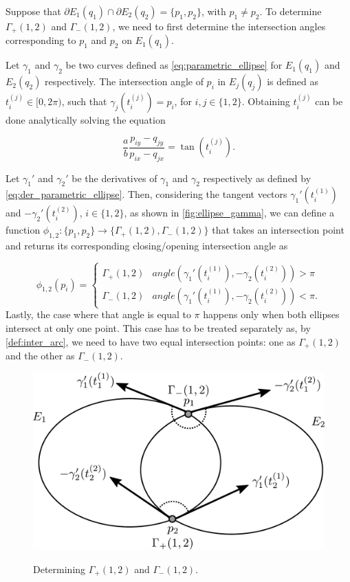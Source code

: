 Suppose that $\partial E_1(q_1) \cap \partial E_2(q_2) = \{p_1, p_2\}$, with $p_1 \neq p_2$. To determine $\Gamma_+(1,2)$ and $\Gamma_-(1,2)$, we need to first determine the intersection angles corresponding to $p_1$ and $p_2$ on $E_1(q_1)$. 

Let $\gamma_1$ and $\gamma_2$ be two curves defined as \autoref{eq:parametric_ellipse} for $E_1(q_1)$ and $E_2(q_2)$ respectively. 
The intersection angle of $p_i$ in $E_j(q_j)$ is defined as $t_i^{(j)} \in [0, 2\pi)$, such that $\gamma_j(t_i^{(j)}) = p_i$, for $i, j \in \{1, 2\}$. Obtaining $t_i^{(j)}$ can be done analytically solving the equation

\begin{equation*}
	\dfrac{a}{b}\dfrac{p_{iy}-q_{jy}}{p_{ix}-q_{jx}} = \tan{(t_i^{(j)})}.
\end{equation*}

Let $\gamma_1'$ and $\gamma_2'$ be the derivatives of $\gamma_1$ and $\gamma_2$ respectively as defined by \autoref{eq:der_parametric_ellipse}. Then, considering the tangent vectors $\gamma_1'(t_i^{(1)})$ and $-\gamma_2'(t_i^{(2)})$, $i\in \{1, 2\}$, as shown in \autoref{fig:ellipse_gamma}, we can define a function $\phi_{1,2}\colon \{p_1, p_2\} \to \{\Gamma_+(1,2), \Gamma_-(1,2)\}$ that takes an intersection point and returns its corresponding closing/opening intersection angle as

\begin{equation*}
\phi_{1,2}(p_i) = \begin{cases}
\Gamma_+(1,2) & angle(\gamma_1'(t_i^{(1)}), -\gamma_2(t_i^{(2)})) > \pi\\
\Gamma_-(1,2) & angle(\gamma_1'(t_i^{(1)}), -\gamma_2(t_i^{(2)})) < \pi.
\end{cases}
\end{equation*}
Lastly, the case where that angle is equal to $\pi$ happens only when both ellipses intersect at only one point. This case has to be treated separately as, by \autoref{def:inter_arc}, we need to have two equal intersection points: one as $\Gamma_+(1,2)$ and the other as $\Gamma_-(1,2)$.

\begin{figure}
	\centering
	
	\caption{Determining $\Gamma_+(1,2)$ and $\Gamma_-(1,2)$.}
	\includegraphics[scale=.38]{tex/figures/ellipse_gamma.pdf}
	\fautor
	\label{fig:ellipse_gamma}
\end{figure}


